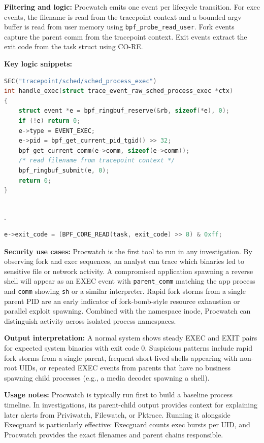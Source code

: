 \documentclass{mnitjaipur}
\begin{document}
\textbf{Filtering and logic:} Procwatch emits one event per lifecycle transition. For exec events, the filename is read from the tracepoint context and a bounded argv buffer is read from user memory using \texttt{bpf\_probe\_read\_user}. Fork events capture the parent comm from the tracepoint context. Exit events extract the exit code from the task struct using CO-RE.

\textbf{Key logic snippets:}
\begin{lstlisting}[language=C,caption={Procwatch exec handler}]
SEC("tracepoint/sched/sched_process_exec")
int handle_exec(struct trace_event_raw_sched_process_exec *ctx)
{
    struct event *e = bpf_ringbuf_reserve(&rb, sizeof(*e), 0);
    if (!e) return 0;
    e->type = EVENT_EXEC;
    e->pid = bpf_get_current_pid_tgid() >> 32;
    bpf_get_current_comm(e->comm, sizeof(e->comm));
    /* read filename from tracepoint context */
    bpf_ringbuf_submit(e, 0);
    return 0;
}
\end{lstlisting}
\\.
\begin{lstlisting}[language=C,caption={Procwatch exit code extraction via CO-RE}]
e->exit_code = (BPF_CORE_READ(task, exit_code) >> 8) & 0xff;
\end{lstlisting}

\textbf{Security use cases:} Procwatch is the first tool to run in any investigation. By observing fork and exec sequences, an analyst can trace which binaries led to sensitive file or network activity. A compromised application spawning a reverse shell will appear as an EXEC event with \texttt{parent\_comm} matching the app process and \texttt{comm} showing \texttt{sh} or a similar interpreter. Rapid fork storms from a single parent PID are an early indicator of fork-bomb-style resource exhaustion or parallel exploit spawning. Combined with the namespace inode, Procwatch can distinguish activity across isolated process namespaces.

\textbf{Output interpretation:} A normal system shows steady EXEC and EXIT pairs for expected system binaries with exit code 0. Suspicious patterns include rapid fork storms from a single parent, frequent short-lived shells appearing with non-root UIDs, or repeated EXEC events from parents that have no business spawning child processes (e.g., a media decoder spawning a shell).

\textbf{Usage notes:} Procwatch is typically run first to build a baseline process timeline. In investigations, its parent-child output provides context for explaining later alerts from Priviwatch, Filewatch, or Pktrace. Running it alongside Execguard is particularly effective: Execguard counts exec bursts per UID, and Procwatch provides the exact filenames and parent chains responsible.
\end{document}
